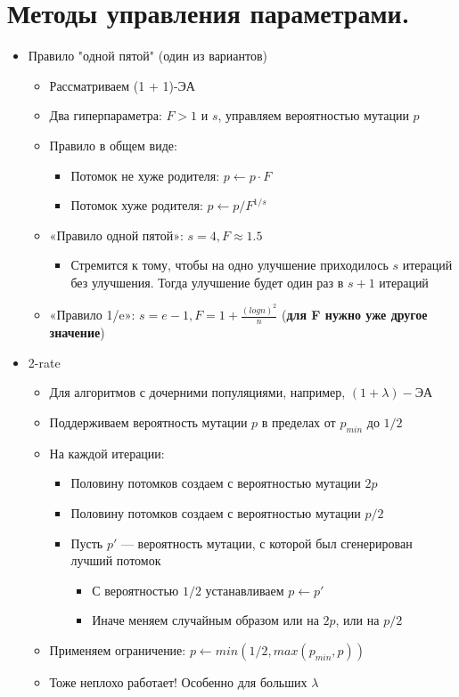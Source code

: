 \section{Методы управления параметрами.}

\begin{itemize}
    \item Правило "одной пятой" (один из вариантов)
    \begin{itemize}
        \item Рассматриваем (1 + 1)-ЭА
        \item Два гиперпараметра: $F > 1$ и $s$, управляем вероятностью мутации $p$
        \item Правило в общем виде:
        \begin{itemize}
            \item Потомок не хуже родителя: $p \leftarrow p · F$ 
            \item Потомок хуже родителя: $p \leftarrow p/F^{1/s}$
        \end{itemize}
        \item «Правило одной пятой»: $s= 4, F \approx 1.5$
        \begin{itemize}
            \item Стремится к тому, чтобы на одно улучшение приходилось $s$ итераций без улучшения. Тогда улучшение будет один раз в $s + 1$ итераций
        \end{itemize}
        \item «Правило 1/e»: $s= e-1, F = 1 + \frac{(logn)^2}{n}$ (\textbf{для F нужно уже другое значение})
    \end{itemize}
    \item 2-rate
    \begin{itemize}
        \item Для алгоритмов с дочерними популяциями, например, $(1 + \lambda)-ЭА$
        \item Поддерживаем вероятность мутации $p$ в пределах от $p_{min}$ до $1/2$
        \item На каждой итерации:
        \begin{itemize}
            \item Половину потомков создаем с вероятностью мутации $2p$
            \item Половину потомков создаем с вероятностью мутации $p/2$
            \item Пусть $p′$ — вероятность мутации, с которой был сгенерирован лучший потомок
            \begin{itemize}
                \item С вероятностью $1/2$ устанавливаем $p \leftarrow p′$
                \item Иначе меняем случайным образом или на $2p$, или на $p/2$
            \end{itemize}
        \end{itemize}
        \item Применяем ограничение: $p \leftarrow min(1/2, max(p_{min}, p ))$
        \item Тоже неплохо работает! Особенно для больших $\lambda$    
    \end{itemize}
\end{itemize}


